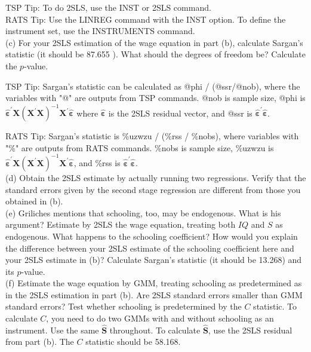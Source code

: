 \documentclass[10pt]{article}
\begin{document}
TSP Tip: To do 2SLS, use the INST or 2SLS command.\\
RATS Tip: Use the LINREG command with the INST option. To define the instrument set, use the INSTRUMENTS command.\\
(c) For your 2SLS estimation of the wage equation in part (b), calculate Sargan's statistic (it should be 87.655 ). What should the degrees of freedom be? Calculate the $p$-value.

TSP Tip: Sargan's statistic can be calculated as @phi / (@ssr/@nob), where the variables with "@" are outputs from TSP commands. @nob is sample size, @phi is $\hat{\boldsymbol{\varepsilon}}^{\prime} \mathbf{X}\left(\mathbf{X}^{\prime} \mathbf{X}\right)^{-1} \mathbf{X}^{\prime} \hat{\boldsymbol{\varepsilon}}$ where $\hat{\boldsymbol{\varepsilon}}$ is the 2SLS residual vector, and @ssr is $\hat{\boldsymbol{\varepsilon}}^{\prime} \hat{\boldsymbol{\varepsilon}}$.

RATS Tip: Sargan's statistic is \%uzwzu / (\%rss / \%nobs), where variables with "\%" are outputs from RATS commands. \%nobs is sample size, \%uzwzu is $\hat{\boldsymbol{\varepsilon}}^{\prime} \mathbf{X}\left(\mathbf{X}^{\prime} \mathbf{X}\right)^{-1} \mathbf{X}^{\prime} \hat{\boldsymbol{\varepsilon}}$, and \%rss is $\hat{\boldsymbol{\varepsilon}}^{\prime} \hat{\boldsymbol{\varepsilon}}$.\\
(d) Obtain the 2SLS estimate by actually running two regressions. Verify that the standard errors given by the second stage regression are different from those you obtained in (b).\\
(e) Griliches mentions that schooling, too, may be endogenous. What is his argument? Estimate by 2SLS the wage equation, treating both $I Q$ and $S$ as endogenous. What happens to the schooling coefficient? How would you explain the difference between your 2SLS estimate of the schooling coefficient here and your 2SLS estimate in (b)? Calculate Sargan's statistic (it should be 13.268) and its $p$-value.\\
(f) Estimate the wage equation by GMM, treating schooling as predetermined as in the 2SLS estimation in part (b). Are 2SLS standard errors smaller than GMM standard errors? Test whether schooling is predetermined by the $C$ statistic. To calculate $C$, you need to do two GMMs with and without schooling as an instrument. Use the same $\widehat{\mathbf{S}}$ throughout. To calculate $\widehat{\mathbf{S}}$, use the 2SLS residual from part (b). The $C$ statistic should be 58.168.
\end{document}

